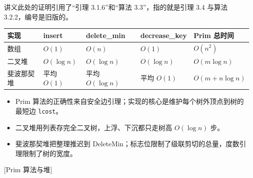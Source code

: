 讲义此处的证明引用了“引理 3.1.6”和“算法 3.3”，指的就是引理 3.4 与算法 3.2.2，编号是旧版的。


\begin{center}
\small
\begin{tabular}{lllll}
\toprule
实现 & insert & delete\_min & decrease\_key & Prim 总时间 \\
\midrule
数组 & $O(1)$ & $O(n)$ & $O(1)$ & $O(n^2)$ \\
二叉堆 & $O(\log n)$ & $O(\log n)$ & $O(\log n)$ & $O(m\log n)$ \\
斐波那契堆 & 平均 $O(1)$ & 平均 $O(\log n)$ & 平均 $O(1)$ & $O(m+n\log n)$ \\
\bottomrule
\end{tabular}
\end{center}
\begin{itemize}
\item Prim 算法的正确性来自安全边引理；实现的核心是维护每个树外顶点到树的最短边 \texttt{lcost}。
\item 二叉堆用列表存完全二叉树，上浮、下沉都只走树高 $O(\log n)$ 步。
\item 斐波那契堆把整理推迟到 DeleteMin；标志位限制了级联剪切的总量，度数引理限制了树的宽度。
\end{itemize}

[Prim 算法与堆]


